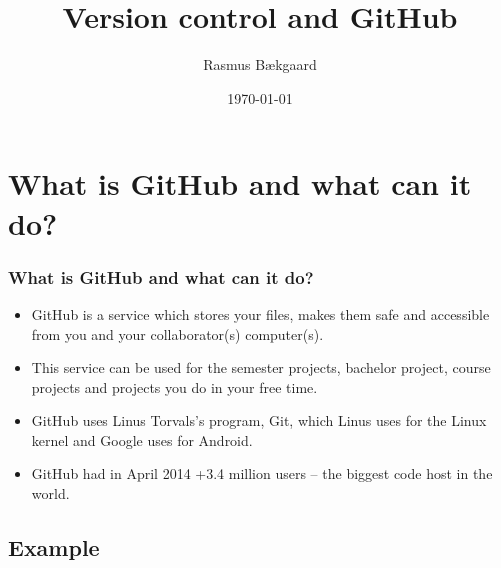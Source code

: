 \documentclass{beamer}
\begin{document}
\title{Version control and GitHub}  
\author{Rasmus Bækgaard}
\date{\today} 





\section{What is GitHub and what can it do?}
\frame
{
	\frametitle{What is GitHub and what can it do?}
	
\begin{itemize}
\item GitHub is a service which stores your files, makes them safe and 
accessible from you and your collaborator(s) computer(s).

\item This service can be used for the semester projects, bachelor project, 
course projects and projects you do in your free time.

\item GitHub uses Linus Torvals's program, Git, which Linus uses for the Linux 
kernel and Google uses for Android.

\item GitHub had in April 2014 +3.4 million users -- the biggest code host in 
the world.
\end{itemize}

}

\subsection{Example}

\end{document}
